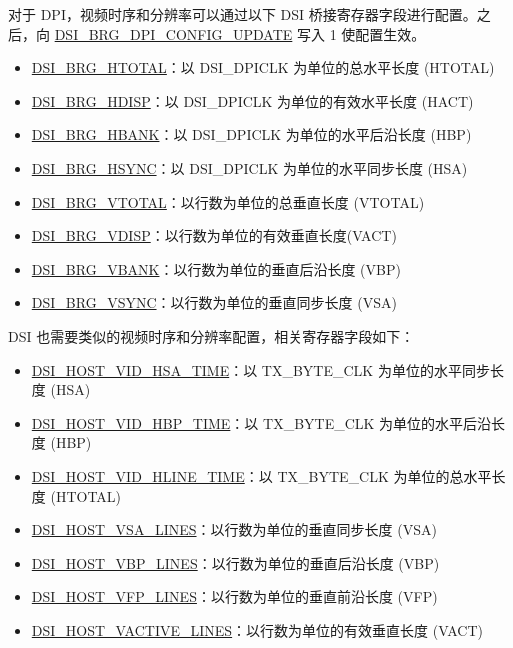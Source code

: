 \documentclass[main\_\_CN.tex]{subfiles}
\begin{document}
对于 DPI，视频时序和分辨率可以通过以下 DSI 桥接寄存器字段进行配置。之后，向 \hyperref[fielddesc:DSIBRGDPICONFIGUPDATE]{DSI\_BRG\_DPI\_CONFIG\_UPDATE} 写入 1 使配置生效。
\begin{itemize}
    \item \hyperref[fielddesc:DSIBRGHTOTAL]{DSI\_BRG\_HTOTAL}：以 DSI\_DPICLK 为单位的总水平长度 (HTOTAL)
    \item \hyperref[fielddesc:DSIBRGHDISP]{DSI\_BRG\_HDISP}：以 DSI\_DPICLK 为单位的有效水平长度 (HACT)
    \item \hyperref[fielddesc:DSIBRGHBANK]{DSI\_BRG\_HBANK}：以 DSI\_DPICLK 为单位的水平后沿长度 (HBP)
    \item \hyperref[fielddesc:DSIBRGHSYNC]{DSI\_BRG\_HSYNC}：以 DSI\_DPICLK 为单位的水平同步长度 (HSA)
    \item \hyperref[fielddesc:DSIBRGVTOTAL]{DSI\_BRG\_VTOTAL}：以行数为单位的总垂直长度 (VTOTAL)
    \item \hyperref[fielddesc:DSIBRGVDISP]{DSI\_BRG\_VDISP}：以行数为单位的有效垂直长度(VACT)
    \item \hyperref[fielddesc:DSIBRGVBANK]{DSI\_BRG\_VBANK}：以行数为单位的垂直后沿长度 (VBP)
    \item \hyperref[fielddesc:DSIBRGVSYNC]{DSI\_BRG\_VSYNC}：以行数为单位的垂直同步长度 (VSA)

\end{itemize}


DSI 也需要类似的视频时序和分辨率配置，相关寄存器字段如下：
\begin{itemize}
    \item \hyperref[fielddesc:DSIHOSTVIDHSATIME]{DSI\_HOST\_VID\_HSA\_TIME}：以 TX\_BYTE\_CLK 为单位的水平同步长度 (HSA)
    \item \hyperref[fielddesc:DSIHOSTVIDHBPTIME]{DSI\_HOST\_VID\_HBP\_TIME}：以 TX\_BYTE\_CLK 为单位的水平后沿长度 (HBP)
    \item \hyperref[fielddesc:DSIHOSTVIDHLINETIME]{DSI\_HOST\_VID\_HLINE\_TIME}：以 TX\_BYTE\_CLK 为单位的总水平长度 (HTOTAL)
    \item \hyperref[fielddesc:DSIHOSTVSALINES]{DSI\_HOST\_VSA\_LINES}：以行数为单位的垂直同步长度 (VSA)
    \item \hyperref[fielddesc:DSIHOSTVBPLINES]{DSI\_HOST\_VBP\_LINES}：以行数为单位的垂直后沿长度 (VBP)
    \item \hyperref[fielddesc:DSIHOSTVFPLINES]{DSI\_HOST\_VFP\_LINES}：以行数为单位的垂直前沿长度 (VFP)
    \item \hyperref[fielddesc:DSIHOSTVACTIVELINES]{DSI\_HOST\_VACTIVE\_LINES}：以行数为单位的有效垂直长度 (VACT)
\end{itemize}
\end{document}
